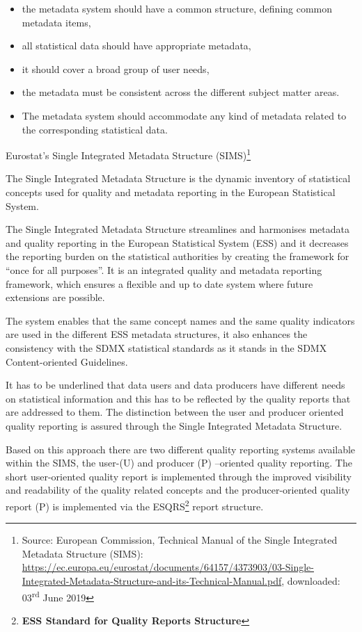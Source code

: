 \documentclass[
]{article}
\begin{document}
\begin{itemize}
\item
  the metadata system should have a common structure, defining common
  metadata items,
\item
  all statistical data should have appropriate metadata,
\item
  it should cover a broad group of user needs,
\item
  the metadata must be consistent across the different subject matter
  areas.
\item
  The metadata system should accommodate any kind of metadata related
  to the corresponding statistical data.
\end{itemize}

Eurostat's Single Integrated Metadata Structure (SIMS)\footnote{Source: European Commission, Technical Manual of the Single
  Integrated Metadata Structure (SIMS):
  \url{https://ec.europa.eu/eurostat/documents/64157/4373903/03-Single-Integrated-Metadata-Structure-and-its-Technical-Manual.pdf},
  downloaded: 03\textsuperscript{rd} June 2019}

The Single Integrated Metadata Structure is the dynamic inventory of
statistical concepts used for quality and metadata reporting in the
European Statistical System.

The Single Integrated Metadata Structure streamlines and harmonises
metadata and quality reporting in the European Statistical System (ESS)
and it decreases the reporting burden on the statistical authorities by
creating the framework for ``once for all purposes''. It is an integrated
quality and metadata reporting framework, which ensures a flexible and
up to date system where future extensions are possible.

The system enables that the same concept names and the same quality
indicators are used in the different ESS metadata structures, it also
enhances the consistency with the SDMX statistical standards as it
stands in the SDMX Content-oriented Guidelines.

It has to be underlined that data users and data producers have
different needs on statistical information and this has to be reflected
by the quality reports that are addressed to them. The distinction
between the user and producer oriented quality reporting is assured
through the Single Integrated Metadata Structure.

Based on this approach there are two different quality reporting systems
available within the SIMS, the user-(U) and producer (P) --oriented
quality reporting. The short user-oriented quality report is implemented
through the improved visibility and readability of the quality related
concepts and the producer-oriented quality report (P) is implemented via
the ESQRS\footnote{\textbf{ESS Standard for Quality Reports Structure}} report structure.
\end{document}
